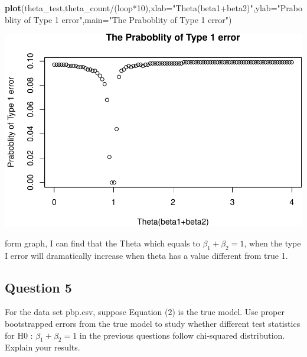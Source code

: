 \documentclass[]{article}
\newenvironment{Shaded}{\begin{snugshade}}{\end{snugshade}}
\newcommand{\KeywordTok}[1]{\textcolor[rgb]{0.13,0.29,0.53}{\textbf{{#1}}}}
\newcommand{\DataTypeTok}[1]{\textcolor[rgb]{0.13,0.29,0.53}{{#1}}}
\newcommand{\DecValTok}[1]{\textcolor[rgb]{0.00,0.00,0.81}{{#1}}}
\newcommand{\StringTok}[1]{\textcolor[rgb]{0.31,0.60,0.02}{{#1}}}
\newcommand{\NormalTok}[1]{{#1}}
\begin{document}
\begin{Shaded}
\begin{Highlighting}[]
\KeywordTok{plot}\NormalTok{(theta_test,theta_count/(loop*}\DecValTok{10}\NormalTok{),}\DataTypeTok{xlab=}\StringTok{"Theta(beta1+beta2)"}\NormalTok{,}\DataTypeTok{ylab=}\StringTok{"Praboblity of Type 1 error"}\NormalTok{,}\DataTypeTok{main=}\StringTok{"The Praboblity of Type 1 error"}\NormalTok{)}
\end{Highlighting}
\end{Shaded}

\includegraphics{BST169Coursework_project_answer_files/figure-latex/Monte Carlo for type1error-1.pdf}

form graph, I can find that the Theta which equals to
\(\beta_1+\beta_2=1\), when the type I error will dramatically increase
when theta has a value different from true 1.

\subsection{Question 5}\label{question-5}

For the data set pbp.csv, suppose Equation (2) is the true model. Use
proper bootstrapped errors from the true model to study whether
different test statistics for H0 : \(\beta_{1} + \beta_{2} = 1\) in the
previous questions follow chi-squared distribution. Explain your
results.
\end{document}
